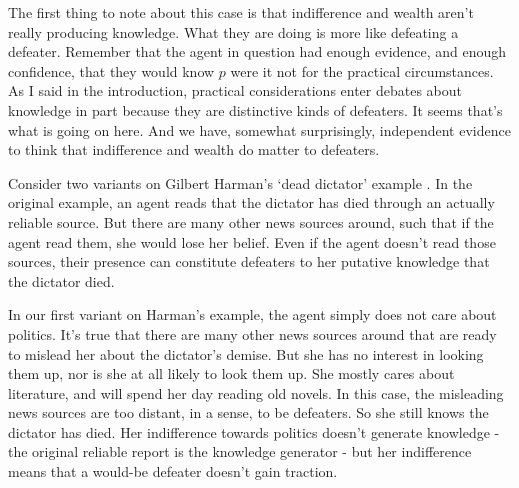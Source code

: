 \documentclass[oneside]{book}
\begin{document}
The first thing to note about this case is that indifference and wealth aren't really producing knowledge. What they are doing is more like defeating a defeater. Remember that the agent in question had enough evidence, and enough confidence, that they would know $p$ were it not for the practical circumstances. As I said in the introduction, practical considerations enter debates about knowledge in part because they are distinctive kinds of defeaters. It seems that's what is going on here. And we have, somewhat surprisingly, independent evidence to think that indifference and wealth do matter to defeaters.

Consider two variants on Gilbert Harman's `dead dictator' example \citep[75]{Harman1973}. In the original example, an agent reads that the dictator has died through an actually reliable source. But there are many other news sources around, such that if the agent read them, she would lose her belief. Even if the agent doesn't read those sources, their presence can constitute defeaters to her putative knowledge that the dictator died.

In our first variant on Harman's example, the agent simply does not care about politics. It's true that there are many other news sources around that are ready to mislead her about the dictator's demise. But she has no interest in looking them up, nor is she at all likely to look them up. She mostly cares about literature, and will spend her day reading old novels. In this case, the misleading news sources are too distant, in a sense, to be defeaters. So she still knows the dictator has died. Her indifference towards politics doesn't generate knowledge - the original reliable report is the knowledge generator - but her indifference means that a would-be defeater doesn't gain traction.
\end{document}
